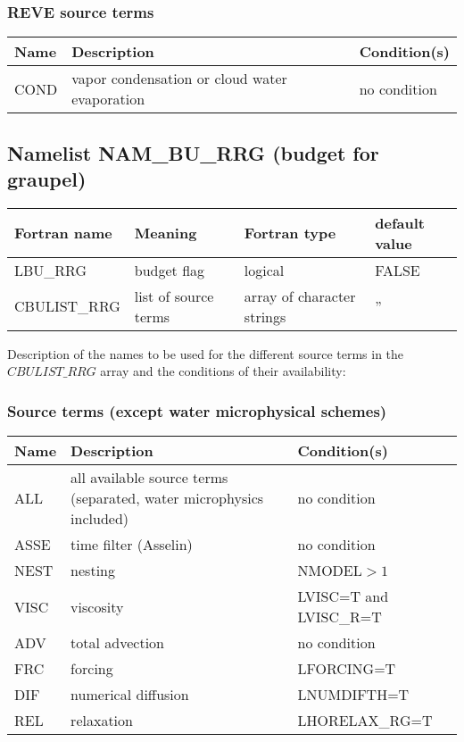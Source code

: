 \subsubsection{REVE source terms}

\begin{longtable} {|p{}|p{}|p{}|}
\hline
Name & Description & Condition(s) \\
\hline \hline
\endhead
COND   & vapor condensation or cloud water evaporation & no condition \\\hline
\end{longtable}


\subsection{Namelist NAM\_BU\_RRG (budget for graupel)}

\begin{longtable} {|p{}|p{}|>{\centering}p{}|p{}<{\centering}|}
\hline
Fortran name & Meaning & Fortran type & default value \\
\hline \hline
\endhead
LBU\_RRG & budget flag & logical & FALSE\index{LBU\_RRG!\innam{NAM\_BU\_RRG}} \\\hline
CBULIST\_RRG & list of source terms & array of character strings & ''\index{CBULIST\_RRG!\innam{NAM\_BU\_RRG}} \\\hline
\end{longtable}

Description of the names to be used for the different source terms in the $CBULIST\_RRG$ array and the conditions of their availability:

\subsubsection{Source terms (except water microphysical schemes)}

\begin{longtable} {|p{}|p{}|p{}|}
\hline
Name & Description & Condition(s) \\
\hline \hline
\endhead
ALL    & all available source terms (separated,  water microphysics included) & no condition \\\hline \hline
ASSE   & time filter (Asselin) & no condition           \\\hline
NEST   & nesting               & NMODEL$>1$             \\\hline
VISC   & viscosity             & LVISC=T and LVISC\_R=T \\\hline
ADV    & total advection       & no condition           \\\hline
FRC    & forcing               & LFORCING=T             \\\hline
DIF    & numerical diffusion   & LNUMDIFTH=T            \\\hline
REL    & relaxation            & LHORELAX\_RG=T         \\\hline
\end{longtable}

